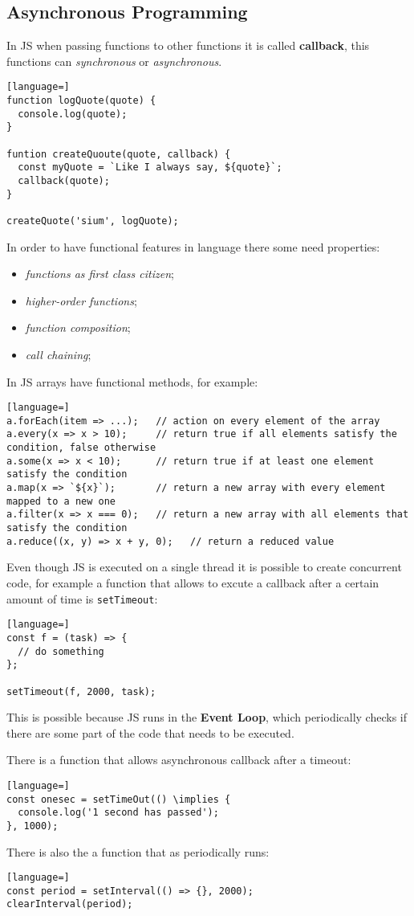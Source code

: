 \documentclass[12pt]{article}
\begin{document}
\subsection{Asynchronous Programming}
In JS when passing functions to other functions it is called \textbf{callback}, this functions can \emph{synchronous} or \emph{asynchronous}.
\begin{lstlisting}[language=]
function logQuote(quote) {
  console.log(quote);
}

funtion createQuoute(quote, callback) {
  const myQuote = `Like I always say, ${quote}`;
  callback(quote);
}

createQuote('sium', logQuote);
\end{lstlisting}
In order to have functional features in language there some need properties:
\begin{itemize}
  \item \emph{functions as first class citizen};
  \item \emph{higher-order functions};
  \item \emph{function composition};
  \item \emph{call chaining};
\end{itemize}
In JS arrays have functional methods, for example:
\begin{lstlisting}[language=]
a.forEach(item => ...);   // action on every element of the array
a.every(x => x > 10);     // return true if all elements satisfy the condition, false otherwise
a.some(x => x < 10);      // return true if at least one element satisfy the condition
a.map(x => `${x}`);       // return a new array with every element mapped to a new one
a.filter(x => x === 0);   // return a new array with all elements that satisfy the condition
a.reduce((x, y) => x + y, 0);   // return a reduced value
\end{lstlisting}
Even though JS is executed on a single thread it is possible to create concurrent code, for example a function that allows to excute a callback after a certain amount of time is \texttt{setTimeout}:
\begin{lstlisting}[language=]
const f = (task) => {
  // do something
};

setTimeout(f, 2000, task);
\end{lstlisting}
This is possible because JS runs in the \textbf{Event Loop}, which periodically checks if there are some part of the code that needs to be executed.

There is a function that allows asynchronous callback after a timeout:
\begin{lstlisting}[language=]
const onesec = setTimeOut(() \implies {
  console.log('1 second has passed');
}, 1000);
\end{lstlisting}
There is also the a function that as periodically runs:
\begin{lstlisting}[language=]
const period = setInterval(() => {}, 2000);
clearInterval(period);
\end{lstlisting}
\end{document}
